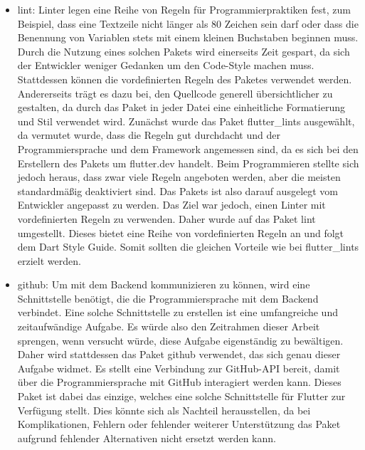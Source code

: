 \begin{itemize}
	\item lint\cite{tech_packageLints}: %
		Linter legen eine Reihe von Regeln für Programmierpraktiken fest, zum Beispiel, dass eine Textzeile nicht länger als 80 Zeichen sein darf oder dass die Benennung von Variablen stets mit einem kleinen Buchstaben beginnen muss. %
		Durch die Nutzung eines solchen Pakets wird einerseits Zeit gespart, da sich der Entwickler weniger Gedanken um den Code-Style machen muss. Stattdessen können die vordefinierten Regeln des Paketes verwendet werden. %
		Andererseits trägt es dazu bei, den Quellcode generell übersichtlicher zu gestalten, da durch das Paket in jeder Datei eine einheitliche Formatierung und Stil verwendet wird. %
		Zunächst wurde das Paket flutter\_lints\cite{tech_packageFlutterLints} ausgewählt, da vermutet wurde, dass die Regeln gut durchdacht und der Programmiersprache und dem Framework angemessen sind, da es sich bei den Erstellern des Pakets um \glqq flutter.dev\grqq{} handelt. Beim Programmieren stellte sich jedoch heraus, dass zwar viele Regeln angeboten werden, aber die meisten standardmäßig deaktiviert sind. Das Pakets ist also darauf ausgelegt vom Entwickler angepasst zu werden. Das Ziel war jedoch, einen Linter mit vordefinierten Regeln zu verwenden. Daher wurde auf das Paket lint umgestellt. Dieses bietet eine Reihe von vordefinierten Regeln an und folgt dem Dart Style Guide\cite{tech_packageDartStyle}. Somit sollten die gleichen Vorteile wie bei flutter\_lints erzielt werden.
	

	\item github\cite{tech_packageGithub}: 
		Um mit dem Backend kommunizieren zu können, wird eine Schnittstelle benötigt, die die Programmiersprache mit dem Backend verbindet. Eine solche Schnittstelle zu erstellen ist eine umfangreiche und zeitaufwändige Aufgabe. Es würde also den Zeitrahmen dieser Arbeit sprengen, wenn versucht würde, diese Aufgabe eigenständig zu bewältigen. %
		Daher wird stattdessen das Paket \glqq github\grqq{} verwendet, das sich genau dieser Aufgabe widmet. Es stellt eine Verbindung zur GitHub-API bereit, damit über die Programmiersprache mit GitHub interagiert werden kann. %
		Dieses Paket ist dabei das einzige, welches eine solche Schnittstelle für Flutter zur Verfügung stellt. Dies könnte sich als Nachteil herausstellen, da bei Komplikationen, Fehlern oder fehlender weiterer Unterstützung das Paket aufgrund fehlender Alternativen nicht ersetzt werden kann.%
		

\end{itemize}
